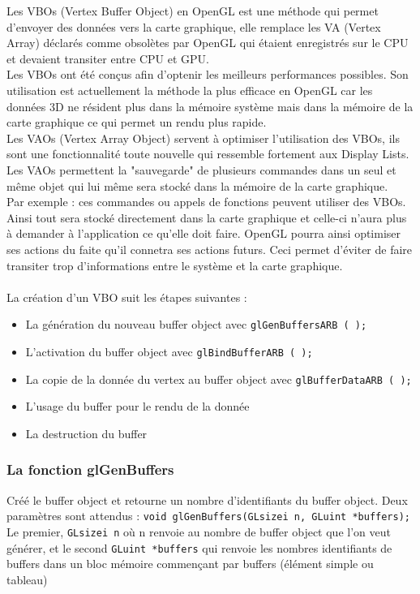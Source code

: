 
Les VBOs (Vertex Buffer Object) en OpenGL est une méthode qui permet d'envoyer des données vers la carte graphique, elle remplace les VA (Vertex Array) déclarés comme obsolètes par OpenGL qui étaient enregistrés sur le CPU et devaient transiter entre CPU et GPU.\\
Les VBOs ont été conçus afin d'optenir les meilleurs performances possibles. Son utilisation est actuellement la méthode la plus efficace en OpenGL car les données 3D ne résident plus dans la mémoire système mais dans la mémoire de la carte graphique ce qui permet un rendu plus rapide.\\
Les VAOs (Vertex Array Object) servent à optimiser l'utilisation des VBOs, ils sont une fonctionnalité toute nouvelle qui ressemble fortement aux Display Lists. Les VAOs permettent la "sauvegarde" de plusieurs commandes dans un seul et même objet qui lui même sera stocké dans la mémoire de la carte graphique. \\
Par exemple : ces commandes ou appels de fonctions peuvent utiliser des VBOs. Ainsi tout sera stocké directement dans la carte graphique et celle-ci n'aura plus à demander à l'application ce qu'elle doit faire. OpenGL pourra ainsi optimiser ses actions du faite qu'il connetra ses actions futurs. Ceci permet d'éviter de faire transiter trop d'informations entre le système et la carte graphique.\\\\
La création d’un VBO suit les étapes suivantes : 
\begin{itemize}
\item La génération du nouveau buffer object avec \verb|glGenBuffersARB ( );|
\item L’activation du buffer object avec \verb|glBindBufferARB ( );|
\item La copie de la donnée du vertex au buffer object avec \verb|glBufferDataARB ( );| 
\item L’usage du buffer pour le rendu de la donnée
\item La destruction du buffer
\end{itemize}
\subsubsection*{La fonction glGenBuffers} 
Créé le buffer object et retourne un nombre d’identifiants du buffer object. Deux paramètres sont attendus : 
\verb|void glGenBuffers(GLsizei n, GLuint *buffers);|
\\
Le premier, \verb|GLsizei n| où n renvoie au nombre de buffer object que l’on veut générer, et le second \verb|GLuint *buffers| qui renvoie les nombres identifiants de buffers dans un bloc mémoire commençant par buffers (élément simple ou tableau)

